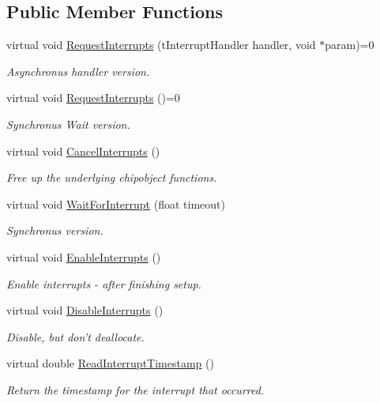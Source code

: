 \subsection*{Public Member Functions}
\begin{DoxyCompactItemize}
\item 
\hypertarget{classInterruptableSensorBase_a9a9cc4a6a409d77704b66d9bccdb5dc1}{
virtual void \hyperlink{classInterruptableSensorBase_a9a9cc4a6a409d77704b66d9bccdb5dc1}{RequestInterrupts} (tInterruptHandler handler, void $\ast$param)=0}
\label{classInterruptableSensorBase_a9a9cc4a6a409d77704b66d9bccdb5dc1}

\begin{DoxyCompactList}\small\item\em Asynchronus handler version. \end{DoxyCompactList}\item 
\hypertarget{classInterruptableSensorBase_a540fc3adfd8690e7e643956a9b1be39b}{
virtual void \hyperlink{classInterruptableSensorBase_a540fc3adfd8690e7e643956a9b1be39b}{RequestInterrupts} ()=0}
\label{classInterruptableSensorBase_a540fc3adfd8690e7e643956a9b1be39b}

\begin{DoxyCompactList}\small\item\em Synchronus Wait version. \end{DoxyCompactList}\item 
virtual void \hyperlink{classInterruptableSensorBase_a3a520da3879ef6fa5e383783ba10c361}{CancelInterrupts} ()
\begin{DoxyCompactList}\small\item\em Free up the underlying chipobject functions. \end{DoxyCompactList}\item 
virtual void \hyperlink{classInterruptableSensorBase_a22a2c4f1fa4e2b4a8dfed2151c4de160}{WaitForInterrupt} (float timeout)
\begin{DoxyCompactList}\small\item\em Synchronus version. \end{DoxyCompactList}\item 
virtual void \hyperlink{classInterruptableSensorBase_a2c340ba527bd05f588d356ed16ac48f3}{EnableInterrupts} ()
\begin{DoxyCompactList}\small\item\em Enable interrupts -\/ after finishing setup. \end{DoxyCompactList}\item 
virtual void \hyperlink{classInterruptableSensorBase_ad619428f0a23dbf9ccc87ab4c187702b}{DisableInterrupts} ()
\begin{DoxyCompactList}\small\item\em Disable, but don't deallocate. \end{DoxyCompactList}\item 
virtual double \hyperlink{classInterruptableSensorBase_ae3bd40c1b8329f35789b02881d9bc78d}{ReadInterruptTimestamp} ()
\begin{DoxyCompactList}\small\item\em Return the timestamp for the interrupt that occurred. \end{DoxyCompactList}\end{DoxyCompactItemize}
